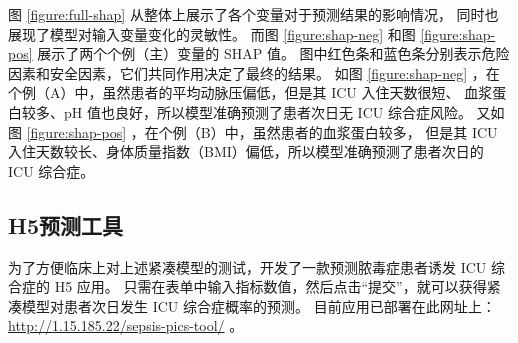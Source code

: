 图 \ref{figure:full-shap} 从整体上展示了各个变量对于预测结果的影响情况，%
同时也展现了模型对输入变量变化的灵敏性。%
而图 \ref{figure:shap-neg} 和图 \ref{figure:shap-pos} 展示了两个个例（主）变量的 SHAP 值。%
图中红色条和蓝色条分别表示危险因素和安全因素，它们共同作用决定了最终的结果。%
如图 \ref{figure:shap-neg} ，在个例（A）中，虽然患者的平均动脉压偏低，但是其 ICU 入住天数很短、%
血浆蛋白较多、pH 值也良好，所以模型准确预测了患者次日无 ICU 综合症风险。%
又如图 \ref{figure:shap-pos} ，在个例（B）中，虽然患者的血浆蛋白较多，%
但是其 ICU 入住天数较长、身体质量指数（BMI）偏低，所以模型准确预测了患者次日的 ICU 综合症。

\subsection{H5预测工具}

\newcommand\PredictionToolURL{http://1.15.185.22/sepsis-pics-tool/}

为了方便临床上对上述紧凑模型的测试，开发了一款预测脓毒症患者诱发 ICU 综合症的 H5 应用。%
只需在表单中输入指标数值，然后点击“提交”，就可以获得紧凑模型对患者次日发生 ICU 综合症概率的预测。%
目前应用已部署在此网址上：\url{\PredictionToolURL} 。

